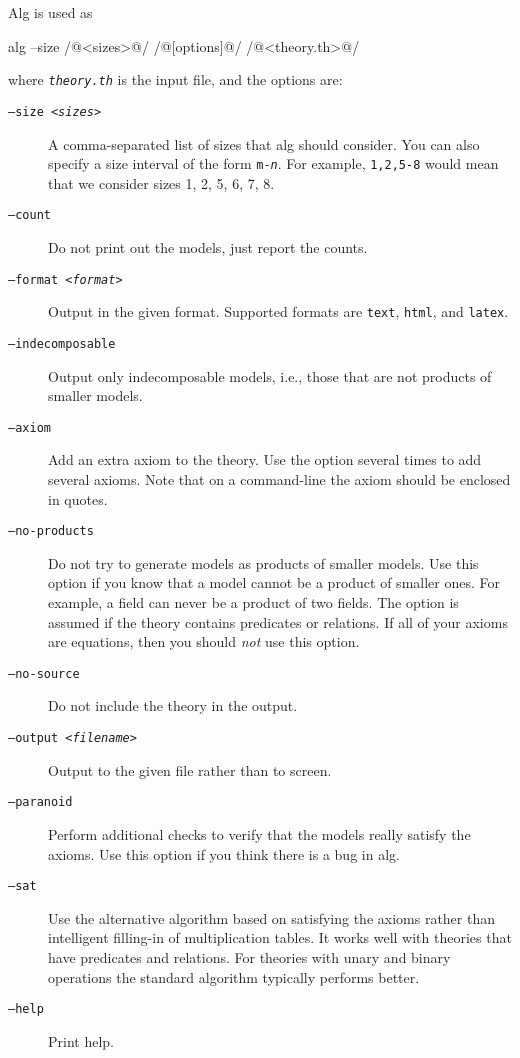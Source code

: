 \documentclass{article}
\begin{document}
Alg is used as
%
\begin{shell}
alg --size /@<sizes>@/ /@[options]@/ /@<theory.th>@/
\end{shell}
%
where \texttt{\textit{theory.th}} is the input file, and the options are:
%
\begin{description}
\item[\texttt{--size \textit{<sizes>}}]
  A comma-separated list of sizes that alg should consider. You can
  also specify a size interval of the form
  \texttt{\texttt{m}-\textit{n}}. For example, \texttt{1,2,5-8} would
  mean that we consider sizes 1, 2, 5, 6, 7, 8.
\item[\texttt{--count}]
  Do not print out the models, just report the counts.
\item[\texttt{--format \textit{<format>}}]
  Output in the given format. Supported formats are \texttt{text},
  \texttt{html}, and \texttt{latex}.
\item[\texttt{--indecomposable}]
  Output only indecomposable models, i.e., those that are not products
  of smaller models.
\item[\texttt{--axiom}]
  Add an extra axiom to the theory. Use the option several times to
  add several axioms. Note that on a command-line the axiom
  should be enclosed in quotes.
\item[\texttt{--no-products}] Do not try to generate models as
  products of smaller models. Use this option if you know that a model
  cannot be a product of smaller ones. For example, a field can never
  be a product of two fields. The option is assumed if the theory
  contains predicates or relations. If all of your axioms are
  equations, then you should \emph{not} use this option.
\item[\texttt{--no-source}]
  Do not include the theory in the output.
\item[\texttt{--output \textit{<filename>}}]
  Output to the given file rather than to screen.
\item[\texttt{--paranoid}]
  Perform additional checks to verify that the models really satisfy
  the axioms. Use this option if you think there is a bug in alg.
\item[\texttt{--sat}]
  Use the alternative algorithm based on satisfying the axioms rather
  than intelligent filling-in of multiplication tables. It works well
  with theories that have predicates and relations. For theories with
  unary and binary operations the standard algorithm typically
  performs better.
\item[\texttt{--help}]
  Print help.
\end{description}
\end{document}
